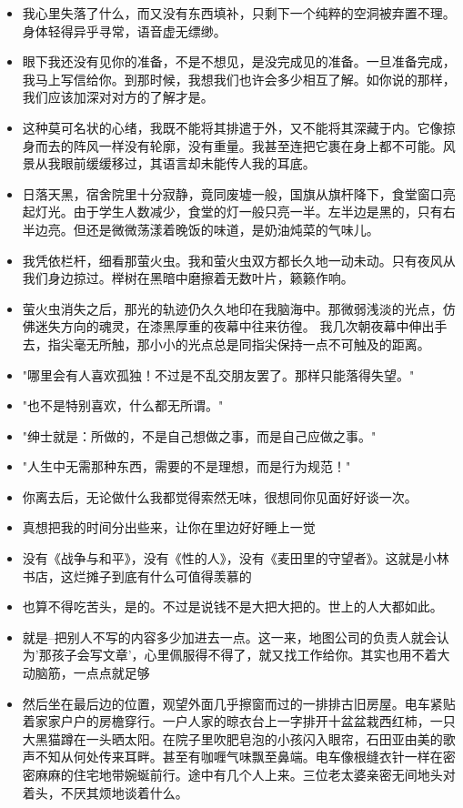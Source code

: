 \documentclass[UTF8,a4paper,8pt]{ctexbook}
\begin{document}
\begin{itemize}
		\item 我心里失落了什么，而又没有东西填补，只剩下一个纯粹的空洞被弃置不理。身体轻得异乎寻常，语音虚无缥缈。
		\item 眼下我还没有见你的准备，不是不想见，是没完成见的准备。一旦准备完成，我马上写信给你。到那时候，我想我们也许会多少相互了解。如你说的那样，我们应该加深对对方的了解才是。
		\item 这种莫可名状的心绪，我既不能将其排遣于外，又不能将其深藏于内。它像掠身而去的阵风一样没有轮廓，没有重量。我甚至连把它裹在身上都不可能。风景从我眼前缓缓移过，其语言却未能传人我的耳底。
		\item 日落天黑，宿舍院里十分寂静，竟同废墟一般，国旗从旗杆降下，食堂窗口亮起灯光。由于学生人数减少，食堂的灯一般只亮一半。左半边是黑的，只有右半边亮。但还是微微荡漾着晚饭的味道，是奶油炖菜的气味儿。
		\item 我凭依栏杆，细看那萤火虫。我和萤火虫双方都长久地一动未动。只有夜风从我们身边掠过。榉树在黑暗中磨擦着无数叶片，籁籁作响。
		\item 萤火虫消失之后，那光的轨迹仍久久地印在我脑海中。那微弱浅淡的光点，仿佛迷失方向的魂灵，在漆黑厚重的夜幕中往来彷徨。 我几次朝夜幕中伸出手去，指尖毫无所触，那小小的光点总是同指尖保持一点不可触及的距离。
		\item "哪里会有人喜欢孤独！不过是不乱交朋友罢了。那样只能落得失望。"
		\item "也不是特别喜欢，什么都无所谓。"
		\item "绅士就是：所做的，不是自己想做之事，而是自己应做之事。"
		\item "人生中无需那种东西，需要的不是理想，而是行为规范！"
		\item 你离去后，无论做什么我都觉得索然无味，很想同你见面好好谈一次。
		\item 真想把我的时间分出些来，让你在里边好好睡上一觉
		\item 没有《战争与和平》，没有《性的人》，没有《麦田里的守望者》。这就是小林书店，这烂摊子到底有什么可值得羡慕的
		\item 也算不得吃苦头，是的。不过是说钱不是大把大把的。世上的人大都如此。
		\item 就是--把别人不写的内容多少加进去一点。这一来，地图公司的负责人就会认为'那孩子会写文章'，心里佩服得不得了，就又找工作给你。其实也用不着大动脑筋，一点点就足够
		\item 然后坐在最后边的位置，观望外面几乎擦窗而过的一排排古旧房屋。电车紧贴着家家户户的房檐穿行。一户人家的晾衣台上一字排开十盆盆栽西红柿，一只大黑猫蹲在一头晒太阳。在院子里吹肥皂泡的小孩闪入眼帘，石田亚由美的歌声不知从何处传来耳畔。甚至有咖喱气味飘至鼻端。电车像根缝衣针一样在密密麻麻的住宅地带婉蜒前行。途中有几个人上来。三位老太婆亲密无间地头对着头，不厌其烦地谈着什么。

\end{itemize}
\end{document}
